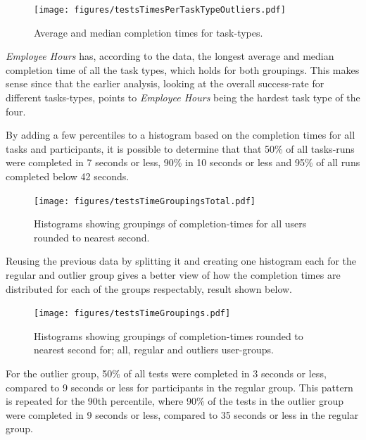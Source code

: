 \documentclass[nofilelist,dvipsnames]{cslthse-msc}
\begin{document}
        \begin{figure}[h!]
          \centering
          \texttt{[image: figures/testsTimesPerTaskTypeOutliers.pdf]}
          \vspace{-0.3cm}
          \caption{Average and median completion times for task-types. }
          \label{label_testsTimesPerTaskTypeOutliers}
        \end{figure}


        \textit{Employee Hours} has, according to the data, the longest average
        and median completion time of all the task types, which holds for both
        groupings. This makes sense since that the earlier analysis, looking at
        the overall success-rate for different tasks-types, points to
        \textit{Employee Hours} being the hardest task type of the four.

        By adding a few percentiles to a histogram based on the completion times for all
        tasks and participants, it is possible to determine that that 50\% of
        all tasks-runs were completed in 7 seconds or less, 90\% in 10 seconds
        or less and 95\% of all runs completed below 42 seconds.

        \begin{figure}[h!]
          \centering
          \texttt{[image: figures/testsTimeGroupingsTotal.pdf]}
          \caption{
            Histograms showing groupings of completion-times for all users
            rounded to nearest second.
          }
        \end{figure}

        Reusing the previous data by splitting it and creating one histogram
        each for the regular and outlier group gives a better view of how the
        completion times are distributed for each of the groups respectably,
        result shown below.

        \begin{figure}[h!]
          \centering
          \texttt{[image: figures/testsTimeGroupings.pdf]}
          \caption{
            Histograms showing groupings of completion-times rounded to nearest
            second for; all, regular and outliers user-groups.
          }
        \end{figure}

        For the outlier group, 50\% of all tests were completed in 3 seconds or
        less, compared to 9 seconds or less for participants in the regular
        group. This pattern is repeated for the 90th percentile, where 90\% of
        the tests in the outlier group were completed in 9 seconds or less,
        compared to 35 seconds or less in the regular group.
\end{document}
